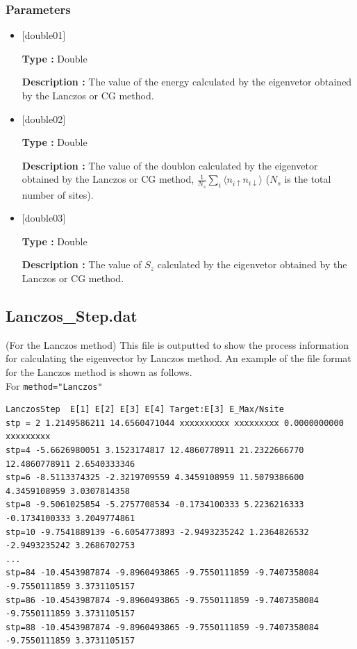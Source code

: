\subsubsection{Parameters}
 \begin{itemize}

  \item  $[$double01$]$
  
 {\bf Type :} Double

{\bf Description :} The value of the energy calculated by the eigenvetor obtained by the Lanczos or CG method.
 
  \item  $[$double02$]$

 {\bf Type :} Double 

{\bf Description :}  The value of the doublon calculated by the eigenvetor obtained by the Lanczos or CG method,
$\frac{1}{N_s} \sum_{i}\langle n_{i\uparrow}n_{i\downarrow}\rangle$ ($N_s$ is the total number of sites).

  \item  $[$double03$]$

 {\bf Type :} Double 

{\bf Description :}  The value of $S_z$ calculated by the eigenvetor obtained by the Lanczos or CG method.

 \end{itemize}


\newpage
\subsection{Lanczos\_Step.dat}
(For the Lanczos method) 
This file is outputted to show the process information for calculating the eigenvector by Lanczos method.
An example of the file format for the Lanczos method is shown as follows.\\

\hspace{-2cm}
For \verb|method="Lanczos"|
\\
\hspace{-2cm}
\begin{minipage}{19cm}
  \small
\begin{screen}
\begin{verbatim}
LanczosStep  E[1] E[2] E[3] E[4] Target:E[3] E_Max/Nsite
stp = 2 1.2149586211 14.6560471044 xxxxxxxxxx xxxxxxxxx 0.0000000000 xxxxxxxxx
stp=4 -5.6626980051 3.1523174817 12.4860778911 21.2322666770 12.4860778911 2.6540333346
stp=6 -8.5113374325 -2.3219709559 4.3459108959 11.5079386600 4.3459108959 3.0307814358
stp=8 -9.5061025854 -5.2757708534 -0.1734100333 5.2236216333 -0.1734100333 3.2049774861
stp=10 -9.7541889139 -6.6054773893 -2.9493235242 1.2364826532 -2.9493235242 3.2686702753
...
stp=84 -10.4543987874 -9.8960493865 -9.7550111859 -9.7407358084 -9.7550111859 3.3731105157
stp=86 -10.4543987874 -9.8960493865 -9.7550111859 -9.7407358084 -9.7550111859 3.3731105157
stp=88 -10.4543987874 -9.8960493865 -9.7550111859 -9.7407358084 -9.7550111859 3.3731105157
\end{verbatim}
\end{screen}
\normalsize
\end{minipage}

